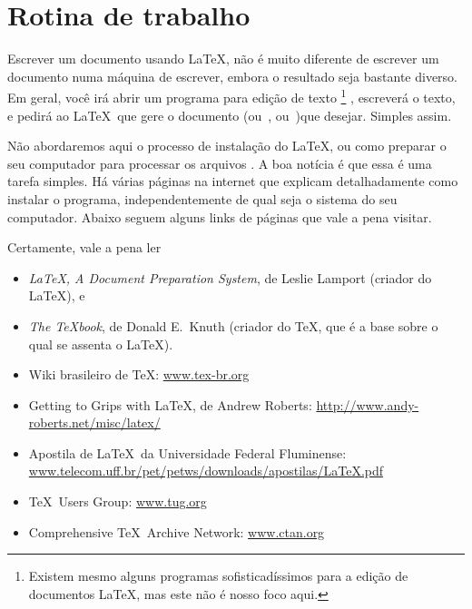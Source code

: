 \section{Rotina de trabalho}

Escrever um documento usando \LaTeX, não é muito diferente de escrever
um documento numa máquina de escrever, embora o resultado seja
bastante diverso. Em geral, você irá abrir um programa para edição
de texto%
\footnote{%
  Existem mesmo alguns programas sofisticadíssimos
  para a edição de documentos \LaTeX, mas este não é nosso foco
  aqui.}%
, escreverá o texto, e pedirá ao \LaTeX\ que gere o
documento  (ou~, ou~)que
desejar. Simples assim.

Não abordaremos aqui o processo de instalação do \LaTeX, ou como
preparar o seu computador para processar os arquivos . A
boa notícia é que essa é uma tarefa simples. Há várias páginas na
internet que explicam detalhadamente como instalar o programa,
independentemente de qual seja o sistema do seu computador. Abaixo seguem
alguns links de páginas que vale a pena visitar.

Certamente, vale a pena ler 
\begin{itemize}
\item \emph{\LaTeX, A Document Preparation System}, de Leslie Lamport
  (criador do \LaTeX),
  e
\item \emph{The \TeX book}, de Donald E.~Knuth (criador do \TeX, que é
  a base sobre o qual se assenta o \LaTeX).
\item Wiki brasileiro de \TeX: \url{www.tex-br.org}
\item Getting to Grips with \LaTeX, de Andrew Roberts: \url{http://www.andy-roberts.net/misc/latex/}
\item Apostila de \LaTeX\ da Universidade Federal Fluminense: \url{www.telecom.uff.br/pet/petws/downloads/apostilas/LaTeX.pdf}
\item \TeX\ Users Group: \url{www.tug.org}
\item Comprehensive \TeX\ Archive Network: \url{www.ctan.org}
\end{itemize}
